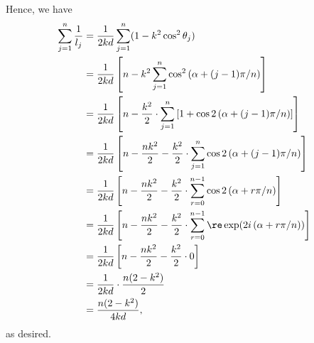 Hence, we have
\begin{align*}
    \sum_{j = 1}^{n} \frac{1}{l_j} & = \frac{1}{2kd} \sum_{j = 1}^{n}(1 - k^2 \cos^2 \theta_j)                                                                              \\
                                   & = \frac{1}{2kd} \left[n - k^2 \sum_{j = 1}^{n} \cos^2 \left(\alpha + (j - 1)\pi / n\right)\right]                                      \\
                                   & = \frac{1}{2kd} \left[n - \frac{k^2}{2} \cdot \sum_{j = 1}^{n} \left[1 + \cos 2 \left(\alpha + (j - 1)\pi / n\right)\right]\right]     \\
                                   & = \frac{1}{2kd} \left[n - \frac{nk^2}{2} - \frac{k^2}{2}\cdot \sum_{j = 1}^{n} \cos 2 \left(\alpha + (j - 1)\pi / n\right)\right]      \\
                                   & = \frac{1}{2kd} \left[n - \frac{nk^2}{2} - \frac{k^2}{2}\cdot \sum_{r = 0}^{n - 1} \cos 2 \left(\alpha + r\pi / n\right)\right]        \\
                                   & = \frac{1}{2kd} \left[n - \frac{nk^2}{2} - \frac{k^2}{2}\cdot \sum_{r = 0}^{n - 1} \re \exp (2i \left(\alpha + r\pi / n\right))\right] \\
                                   & = \frac{1}{2kd} \left[n - \frac{nk^2}{2} - \frac{k^2}{2}\cdot 0\right]                                                                 \\
                                   & = \frac{1}{2kd} \cdot \frac{n (2 - k^2)}{2}                                                                                            \\
                                   & = \frac{n (2 - k^2)}{4kd},
\end{align*}
as desired.